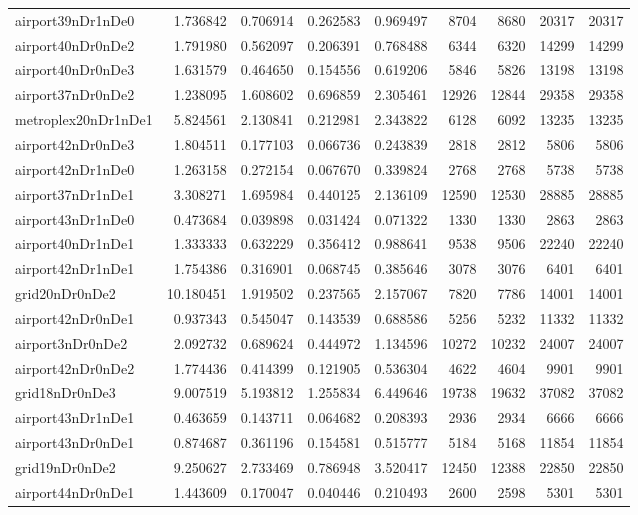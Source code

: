 \begin{longtable}{|l|r|r|r|r|r|r|r|r|}
airport39nDr1nDe0 & 1.736842 & 0.706914 & 0.262583 & 0.969497 & 8704 & 8680 & 20317 & 20317 \\
airport40nDr0nDe2 & 1.791980 & 0.562097 & 0.206391 & 0.768488 & 6344 & 6320 & 14299 & 14299 \\
airport40nDr0nDe3 & 1.631579 & 0.464650 & 0.154556 & 0.619206 & 5846 & 5826 & 13198 & 13198 \\
airport37nDr0nDe2 & 1.238095 & 1.608602 & 0.696859 & 2.305461 & 12926 & 12844 & 29358 & 29358 \\
metroplex20nDr1nDe1 & 5.824561 & 2.130841 & 0.212981 & 2.343822 & 6128 & 6092 & 13235 & 13235 \\
airport42nDr0nDe3 & 1.804511 & 0.177103 & 0.066736 & 0.243839 & 2818 & 2812 & 5806 & 5806 \\
airport42nDr1nDe0 & 1.263158 & 0.272154 & 0.067670 & 0.339824 & 2768 & 2768 & 5738 & 5738 \\
airport37nDr1nDe1 & 3.308271 & 1.695984 & 0.440125 & 2.136109 & 12590 & 12530 & 28885 & 28885 \\
airport43nDr1nDe0 & 0.473684 & 0.039898 & 0.031424 & 0.071322 & 1330 & 1330 & 2863 & 2863 \\
airport40nDr1nDe1 & 1.333333 & 0.632229 & 0.356412 & 0.988641 & 9538 & 9506 & 22240 & 22240 \\
airport42nDr1nDe1 & 1.754386 & 0.316901 & 0.068745 & 0.385646 & 3078 & 3076 & 6401 & 6401 \\
grid20nDr0nDe2 & 10.180451 & 1.919502 & 0.237565 & 2.157067 & 7820 & 7786 & 14001 & 14001 \\
airport42nDr0nDe1 & 0.937343 & 0.545047 & 0.143539 & 0.688586 & 5256 & 5232 & 11332 & 11332 \\
airport3nDr0nDe2 & 2.092732 & 0.689624 & 0.444972 & 1.134596 & 10272 & 10232 & 24007 & 24007 \\
airport42nDr0nDe2 & 1.774436 & 0.414399 & 0.121905 & 0.536304 & 4622 & 4604 & 9901 & 9901 \\
grid18nDr0nDe3 & 9.007519 & 5.193812 & 1.255834 & 6.449646 & 19738 & 19632 & 37082 & 37082 \\
airport43nDr1nDe1 & 0.463659 & 0.143711 & 0.064682 & 0.208393 & 2936 & 2934 & 6666 & 6666 \\
airport43nDr0nDe1 & 0.874687 & 0.361196 & 0.154581 & 0.515777 & 5184 & 5168 & 11854 & 11854 \\
grid19nDr0nDe2 & 9.250627 & 2.733469 & 0.786948 & 3.520417 & 12450 & 12388 & 22850 & 22850 \\
airport44nDr0nDe1 & 1.443609 & 0.170047 & 0.040446 & 0.210493 & 2600 & 2598 & 5301 & 5301 \\

\end{longtable}
